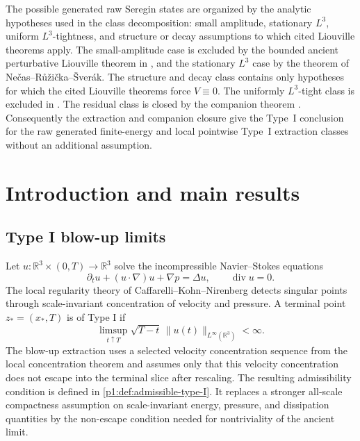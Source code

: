 \documentclass[11pt]{amsart}
\theoremstyle{plain}
\theoremstyle{definition}
\theoremstyle{remark}
\numberwithin{equation}{section}
\newcommand{\R}{\mathbb R}
\newcommand{\divergence}{\operatorname{div}}
\begin{document}
The possible generated raw Seregin states are organized by the
analytic hypotheses used in the class decomposition: small amplitude,
stationary \(L^3\), uniform \(L^3\)-tightness, and structure or decay assumptions to which
cited Liouville theorems apply.  The small-amplitude case is excluded by the bounded ancient
perturbative Liouville theorem in , and the stationary \(L^3\) case by
the theorem of Ne\v{c}as--R\r{u}\v{z}i\v{c}ka--\v{S}ver\'ak.  The
structure and decay class contains only hypotheses for which the cited Liouville
theorems force \(V\equiv0\).  The uniformly \(L^3\)-tight class is excluded in
.  The residual class is closed by the companion
theorem .  Consequently the extraction and companion
closure give the Type~I conclusion for the raw generated finite-energy and
local pointwise Type~I extraction classes without an additional assumption.

\section{Introduction and main results}\label{p1:sec:introduction}

\subsection{Type I blow-up limits}

Let \(u:\R^3\times(0,T)\to\R^3\) solve the incompressible Navier--Stokes
equations
\begin{equation}\label{p1:eq:NS}
   \partial_tu+(u\cdot\nabla)u+\nabla p=\Delta u,\qquad
   \divergence u=0.
\end{equation}
The local regularity theory of Caffarelli--Kohn--Nirenberg \cite{CKN1982}
detects singular points through scale-invariant concentration of velocity and
pressure.  A terminal point \(z_*=(x_*,T)\) is of Type I if
\begin{equation}\label{p1:eq:type-I-bound}
   \limsup_{t\uparrow T}\sqrt{T-t}\,
   \|u(t)\|_{L^\infty(\R^3)}<\infty .
\end{equation}
The blow-up extraction uses a selected velocity concentration sequence from
the local concentration theorem and assumes only that this velocity
concentration does not escape into the terminal slice after rescaling.  The
resulting admissibility condition is defined in
\cref{p1:def:admissible-type-I}.  It replaces a stronger all-scale compactness
assumption on scale-invariant energy, pressure, and dissipation quantities by
the non-escape condition needed for nontriviality of the ancient limit.
\end{document}

